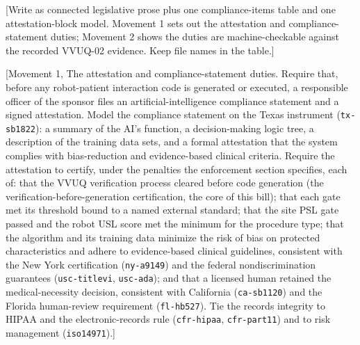 
[Write as connected legislative prose plus one compliance-items table and one
attestation-block model. Movement 1 sets out the attestation and compliance-
statement duties; Movement 2 shows the duties are machine-checkable against the
recorded VVUQ-02 evidence. Keep file names in the table.]

[Movement 1, The attestation and compliance-statement duties. Require that, before
any robot-patient interaction code is generated or executed, a responsible officer
of the sponsor files an artificial-intelligence compliance statement and a signed
attestation. Model the compliance statement on the Texas instrument
(\texttt{tx-sb1822}): a summary of the AI's function, a decision-making logic
tree, a description of the training data sets, and a formal attestation that the
system complies with bias-reduction and evidence-based clinical criteria. Require
the attestation to certify, under the penalties the enforcement section specifies,
each of: that the VVUQ verification process cleared before code generation (the
verification-before-generation certification, the core of this bill); that each
gate met its threshold bound to a named external standard; that the site PSL gate
passed and the robot USL score met the minimum for the procedure type; that the
algorithm and its training data minimize the risk of bias on protected
characteristics and adhere to evidence-based clinical guidelines, consistent with
the New York certification (\texttt{ny-a9149}) and the federal nondiscrimination
guarantees (\texttt{usc-titlevi}, \texttt{usc-ada}); and that a licensed human
retained the medical-necessity decision, consistent with California
(\texttt{ca-sb1120}) and the Florida human-review requirement (\texttt{fl-hb527}).
Tie the records integrity to HIPAA and the electronic-records rule
(\texttt{cfr-hipaa}, \texttt{cfr-part11}) and to risk management
(\texttt{iso14971}).]

